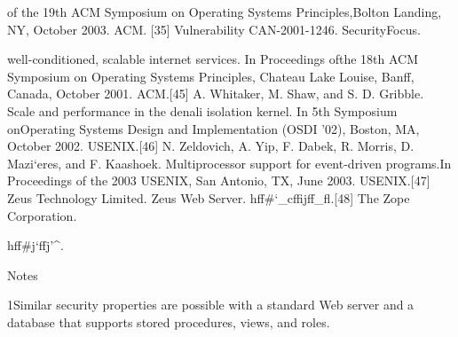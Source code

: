 of the 19th ACM Symposium on Operating Systems Principles,Bolton Landing, NY, October 2003. ACM.
[35] Vulnerability CAN-2001-1246. SecurityFocus.

well-conditioned, scalable internet services. In Proceedings ofthe 18th ACM Symposium on Operating Systems Principles,
Chateau Lake Louise, Banff, Canada, October 2001. ACM.[45] A. Whitaker, M. Shaw, and S. D. Gribble. Scale and
performance in the denali isolation kernel. In 5th Symposium onOperating Systems Design and Implementation (OSDI '02),
Boston, MA, October 2002. USENIX.[46] N. Zeldovich, A. Yip, F. Dabek, R. Morris, D. Mazi`eres, and
F. Kaashoek. Multiprocessor support for event-driven programs.In Proceedings of the 2003 USENIX, San Antonio, TX, June
2003. USENIX.[47] Zeus Technology Limited. Zeus Web Server.
h\Sigma \Sigma \Upsilon \Phi \Psi \Psi \Omega \Omega \Omega ff#`_cffijff_fl.[48] The Zope Corporation.

h\Sigma \Sigma \Upsilon \Phi \Psi \Psi \Omega \Omega \Omega ff#j\Upsilon `ffj'^.

Notes

1Similar security properties are possible with a standard Web server
and a database that supports stored procedures, views, and roles.